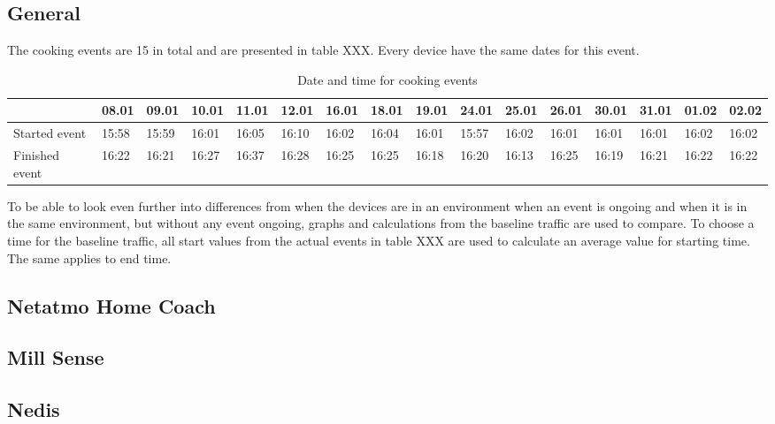 \subsection{General}
The cooking events are 15 in total and are presented in table XXX. Every device have the same dates for this event. 
\begin{table}[!hbtp]
    \centering
    \begin{adjustbox}{width=1\textwidth}
            \begin{tabular}{l|l|l|l|l|l|l|l|l|l|l|l|l|l|l|l|}
            \cline{2-16} 
            & 08.01 & 09.01 & 10.01 & 11.01 & 12.01 & 16.01 & 18.01 & 19.01 & 24.01 & 25.01 & 26.01 & 30.01 & 31.01 & 01.02 & 02.02 \\
            \hline
            \multicolumn{1}{|l|}{Started event}  & 15:58 & 15:59 & 16:01 & 16:05 & 16:10 & 16:02 & 16:04 & 16:01 & 15:57 & 16:02 & 16:01 & 16:01 & 16:01 & 16:02 & 16:02 \\ 
            \hline
            \multicolumn{1}{|l|}{Finished event} & 16:22 & 16:21 & 16:27 & 16:37 & 16:28 & 16:25 & 16:25 & 16:18 & 16:20 & 16:13 & 16:25 & 16:19 & 16:21 & 16:22 & 16:22 \\ 
            \hline
            \end{tabular}
    \end{adjustbox}
    \caption{Date and time for cooking events}
    \label{tab:CookingDates}
\end{table}
\FloatBarrier

To be able to look even further into differences from when the devices are in an environment when an event is ongoing and when it is in the same environment, but without any event ongoing, graphs and calculations from the baseline traffic are used to compare. To choose a time for the baseline traffic, all start values from the actual events in table XXX are used to calculate an average value for starting time. The same applies to end time. 


\subsection{Netatmo Home Coach}
\subsection{Mill Sense}
\subsection{Nedis}

